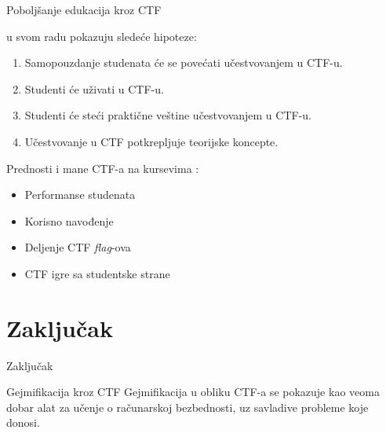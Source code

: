 \documentclass[aspectratio=169,xcolor=dvipsnames]{beamer}
\begin{document}

\begin{frame}{Poboljšanje edukacija kroz CTF}

    \cite{ctfleune} u svom radu pokazuju sledeće hipoteze:
    \begin{enumerate}
        \item Samopouzdanje studenata će se povećati učestvovanjem u CTF-u.
        \item Studenti će uživati u CTF-u.
        \item Studenti će steći praktične veštine učestvovanjem u CTF-u.
        \item Učestvovanje u CTF potkrepljuje teorijske koncepte.
    \end{enumerate}

\end{frame}



\begin{frame}{Prednosti i mane CTF-a na kursevima}
    \cite{ctfuni}:
    \begin{itemize}
        \item Performanse studenata
        \item Korisno navođenje
        \item Deljenje CTF \emph{flag}-ova
        \item CTF igre sa studentske strane
    \end{itemize}
\end{frame}

\section{Zaključak}

\begin{frame}{Zaključak}
    \begin{alertblock}{Gejmifikacija kroz CTF}
        Gejmifikacija u obliku CTF-a se pokazuje kao veoma dobar alat za 
        učenje o računarskoj bezbednosti, uz savladive probleme koje donosi.
    \end{alertblock}
\end{frame}

\end{document}
